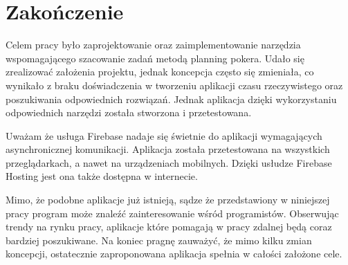 ﻿\chapter*{Zakończenie}

Celem pracy było zaprojektowanie oraz zaimplementowanie narzędzia wspomagającego szacowanie zadań metodą planning pokera.
Udało się zrealizować założenia projektu, jednak koncepcja często się zmieniała,
co wynikało z braku doświadczenia w tworzeniu aplikacji czasu rzeczywistego oraz poszukiwania odpowiednich rozwiązań.
Jednak aplikacja dzięki wykorzystaniu odpowiednich narzędzi została stworzona i przetestowana.

Uważam że usługa Firebase nadaje się świetnie do aplikacji wymagających asynchronicznej komunikacji.
Aplikacja została przetestowana na wszystkich przeglądarkach, a nawet na urządzeniach mobilnych.
Dzięki usłudze Firebase Hosting jest ona także dostępna w internecie.

Mimo, że podobne aplikacje już istnieją,
sądze że przedstawiony w niniejszej pracy program może znaleźć zainteresowanie wśród programistów.
Obserwując trendy na rynku pracy, aplikacje które pomagają w pracy zdalnej będą coraz bardziej poszukiwane.
Na koniec pragnę zauważyć, że mimo kilku zmian koncepcji, ostatecznie zaproponowana aplikacja spełnia w całości założone cele.

